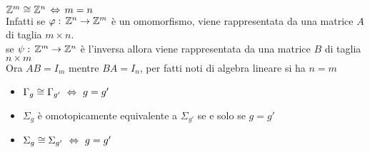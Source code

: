 \spazio
\begin{oss}$\mathbb{Z}^m \cong \mathbb{Z}^n \, \Leftrightarrow \, m=n$\\
Infatti se $\varphi:\, \mathbb{Z}^n \to \mathbb{Z}^m$ \`e un omomorfismo, viene rappresentata da una matrice $A$ di taglia $m \times n$.\\
se $\psi:\, \mathbb{Z}^m \to\mathbb{Z}^n$ \`e l'inversa allora viene rappresentata da una matrice $B$ di taglia $n \times m$\\
Ora $AB=I_m$ mentre $BA=I_n$, per fatti noti di algebra lineare si ha $n=m$
\end{oss}
\begin{cor}\bbianco
\begin{itemize}
\item $\Gamma_g \cong \Gamma_{g'} \, \, \Leftrightarrow \, \, g=g'$
\item $\Sigma_g$ \`e omotopicamente equivalente a $\Sigma_{g'}$ se e solo se $g=g'$
\item $\Sigma_g \cong \Sigma_{g'} \, \, \Leftrightarrow \, \, g=g'$
\end{itemize}
\end{cor}

